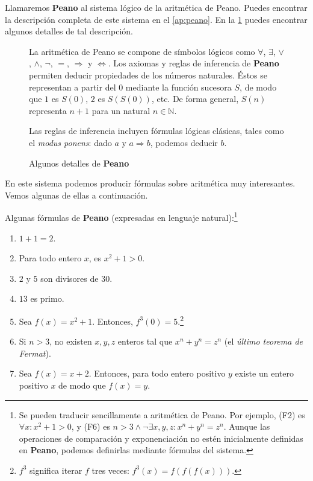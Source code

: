 Llamaremos \textbf{Peano} al sistema lógico de la aritmética de Peano. Puedes encontrar la descripción completa de este sistema en el \cref{ap:peano}. En la \cref{fig:peano} puedes encontrar algunos detalles de tal descripción.
\vspace{8pt}
\begin{figure}[H]
\begin{framed}
La aritmética de Peano se compone de símbolos lógicos como $\forall$, $\exists$, $\vee$, $\wedge$, $\neg$, $=$, $\Rightarrow$ y $\iff$. Los axiomas y reglas de inferencia de \textbf{Peano} permiten deducir propiedades de los números naturales. Éstos se representan a partir del $0$ mediante la función sucesora $S$, de modo que $1$ es $S(0)$, $2$ es $S(S(0))$, etc. De forma general, $S(n)$ representa $n+1$ para un natural $n\in\mathbb{N}$.

Las reglas de inferencia incluyen fórmulas lógicas clásicas, tales como el \emph{modus ponens}: dado $a$ y $a\Rightarrow b$, podemos deducir $b$.
\end{framed}
\caption{Algunos detalles de \textbf{Peano}}
\label{fig:peano}
\end{figure}
En este sistema podemos producir fórmulas sobre aritmética muy interesantes. Vemos algunas de ellas a continuación.
\begin{ejemplo}\label{ej:formulas-peano}
Algunas fórmulas de \textbf{Peano} (expresadas en lenguaje natural):\footnote{Se pueden traducir sencillamente a aritmética de Peano. Por ejemplo, (F2) es $\forall x : x^2+1>0$, y (F6) es \linebreak $n>3 \wedge \neg \exists x,y,z : x^n+y^n=z^n$. Aunque las operaciones de comparación y exponenciación no estén inicialmente definidas en \textbf{Peano}, podemos definirlas mediante fórmulas del sistema.}
\begin{enumerate}[label=(PF\arabic*)]
    \item $1+1=2$.
    \item Para todo entero $x$, es $x^2 + 1 > 0$.
    \item $2$ y $5$ son divisores de $30$.
    \item $13$ es primo.
    \item Sea $f(x)=x^2+1$. Entonces, $f^3(0)=5$.\footnote{$f^3$ significa iterar $f$ tres veces: $f^3(x)=f(f(f(x)))$.}
    \item Si $n>3$, no existen $x,y,z$ enteros tal que $x^n+y^n=z^n$ (el \emph{último teorema de Fermat}).
    \item Sea $f(x)=x+2$. Entonces, para todo entero positivo $y$ existe un entero positivo $x$ de modo que $f(x)=y$.
\end{enumerate}
\end{ejemplo}

